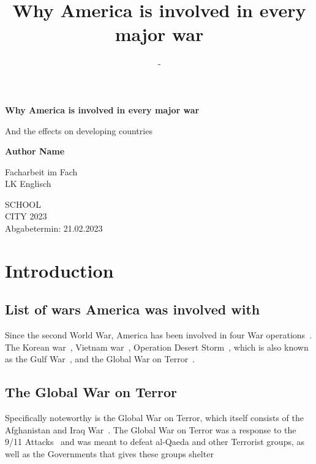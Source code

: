 \documentclass[11pt,a4paper]{article}
\title{Why America is involved in every major war}
\author{-}
\begin{document}
	\begin{center}
		\vspace*{1cm}
		
		\Huge
		\textbf{Why America is involved in every major war}
		
		\vspace{0.5cm}
		\LARGE
		And the effects on developing countries
		
		\vspace{1.5cm}
		
		\textbf{Author Name}
		
		\vspace{1.5cm}
		
		Facharbeit im Fach\\
		LK Englisch
		
		\vfill
		\Large
		SCHOOL\\
		CITY 2023\\
		Abgabetermin: 21.02.2023
	\end{center}
	\newpage
	\section{Introduction}
		\subsection{List of wars America was involved with}
		Since the second World War, America has been involved in four War operations~\cite{va-gov-american-wars}.
		The Korean war~\cite{va-gov-american-wars}, Vietnam war~\cite{va-gov-american-wars}, Operation Desert Storm~\cite{va-gov-american-wars}, which is also known as the Gulf War~\cite{defense-gov-gulf}, and the Global War on Terror~\cite{va-gov-american-wars}.
		\subsection{The Global War on Terror}
		Specifically noteworthy is the Global War on Terror, which itself consists of the Afghanistan and Iraq War~\cite{gowt-bushlibrary}. 
		The Global War on Terror was a response to the 9/11 Attacks~\cite{gowt-hundred-days} and was meant to defeat al-Qaeda and other Terrorist groups, as well as the Governments that gives these groups shelter~\cite{gowt-bushlibrary}
	{}
	
\end{document}
